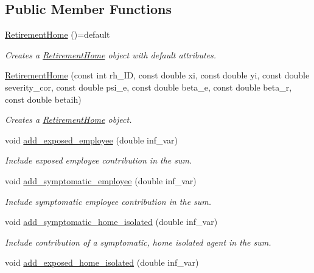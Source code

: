 \subsection*{Public Member Functions}
\begin{DoxyCompactItemize}
\item 
\hyperlink{classRetirementHome_a9161850a079e6f54e129eeceb5fedf37}{Retirement\+Home} ()=default
\begin{DoxyCompactList}\small\item\em Creates a \hyperlink{classRetirementHome}{Retirement\+Home} object with default attributes. \end{DoxyCompactList}\item 
\hyperlink{classRetirementHome_a31e01ecb1d6a99468939ed75090803ef}{Retirement\+Home} (const int rh\+\_\+\+ID, const double xi, const double yi, const double severity\+\_\+cor, const double psi\+\_\+e, const double beta\+\_\+e, const double beta\+\_\+r, const double betaih)
\begin{DoxyCompactList}\small\item\em Creates a \hyperlink{classRetirementHome}{Retirement\+Home} object. \end{DoxyCompactList}\item 
void \hyperlink{classRetirementHome_a7b2c07f448001eff03b70fc460701fbd}{add\+\_\+exposed\+\_\+employee} (double inf\+\_\+var)
\begin{DoxyCompactList}\small\item\em Include exposed employee contribution in the sum. \end{DoxyCompactList}\item 
void \hyperlink{classRetirementHome_ab2a24b8583ae1e34cc8baf2d04c27116}{add\+\_\+symptomatic\+\_\+employee} (double inf\+\_\+var)
\begin{DoxyCompactList}\small\item\em Include symptomatic employee contribution in the sum. \end{DoxyCompactList}\item 
void \hyperlink{classRetirementHome_a8c7f00431e809d16b335d18daf512df1}{add\+\_\+symptomatic\+\_\+home\+\_\+isolated} (double inf\+\_\+var)
\begin{DoxyCompactList}\small\item\em Include contribution of a symptomatic, home isolated agent in the sum. \end{DoxyCompactList}\item 
void \hyperlink{classRetirementHome_aaa3cd3799f2c48c92d5265bcfe514640}{add\+\_\+exposed\+\_\+home\+\_\+isolated} (double inf\+\_\+var)

\end{DoxyCompactItemize}
